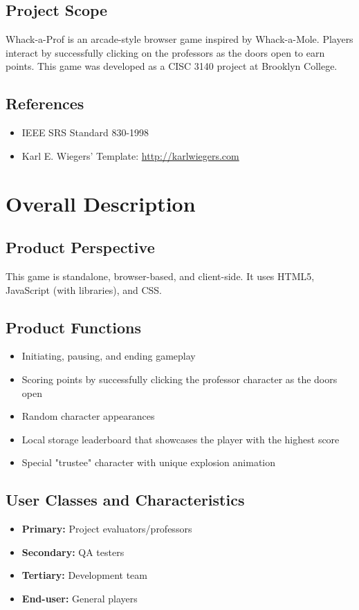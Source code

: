 \documentclass{scrreprt}
\begin{document}
\section{Project Scope}
Whack-a-Prof is an arcade-style browser game inspired by Whack-a-Mole. Players interact by successfully clicking on the professors as the doors open to earn points. This game was developed as a CISC 3140 project at Brooklyn College.

\section{References}
\begin{itemize}
    \item IEEE SRS Standard 830-1998
    \item Karl E. Wiegers’ Template: \url{http://karlwiegers.com}
\end{itemize}

\chapter{Overall Description}

\section{Product Perspective}
This game is standalone, browser-based, and client-side. It uses HTML5, JavaScript (with libraries), and CSS.

\section{Product Functions}
\begin{itemize}
    \item Initiating, pausing, and ending gameplay
    \item Scoring points by successfully clicking the professor character as the doors open
    \item Random character appearances
    \item Local storage leaderboard that showcases the player with the highest score
    \item Special "trustee" character with unique explosion animation
\end{itemize}

\section{User Classes and Characteristics}
\begin{itemize}
    \item \textbf{Primary:} Project evaluators/professors
    \item \textbf{Secondary:} QA testers
    \item \textbf{Tertiary:} Development team
    \item \textbf{End-user:} General players
\end{itemize}
\end{document}
